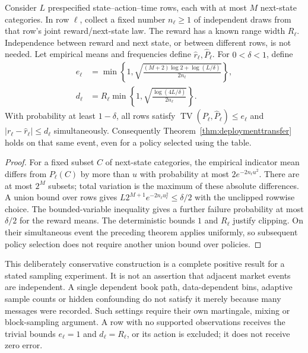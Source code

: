 \begin{proposition}
\label{prop:deploymentcoverage}
Consider $L$ prespecified state--action--time rows, each with at most $M$
next-state categories. In row $\ell$, collect a fixed number $n_\ell\ge1$
of independent draws from that row's joint reward/next-state law.
The reward has a known range width $R_\ell$. Independence between reward
and next state, or between different rows, is not needed. Let empirical
means and frequencies define $\widehat r_\ell,\widehat P_\ell$.
For $0<\delta<1$, define
\begin{align}
 e_\ell&=\min\left\{1,
 \sqrt{\frac{(M+2)\log2+\log(L/\delta)}{2n_\ell}}\right\},
 \label{eq:deployeps}\\
 d_\ell&=R_\ell\min\left\{1,
 \sqrt{\frac{\log(4L/\delta)}{2n_\ell}}\right\}.
 \label{eq:deployeta}
\end{align}
With probability at least $1-\delta$, all rows satisfy
$\operatorname{TV}(P_\ell,\widehat P_\ell)\le e_\ell$ and
$|r_\ell-\widehat r_\ell|\le d_\ell$ simultaneously.
Consequently Theorem~\ref{thm:deploymenttransfer} holds on that same event,
even for a policy selected using the table.
\end{proposition}
\begin{proof}
For a fixed subset $C$ of next-state categories, the empirical indicator
mean differs from $P_\ell(C)$ by more than $u$ with probability at most
$2e^{-2n_\ell u^2}$. There are at most $2^M$ subsets; total variation is
the maximum of these absolute differences. A union bound over rows gives
$L2^{M+1}e^{-2n_\ell u_\ell^2}\le\delta/2$ with the unclipped rowwise
choice. The bounded-variable inequality gives a further failure
probability at most $\delta/2$ for the reward means. The deterministic
bounds $1$ and $R_\ell$ justify clipping. On their simultaneous event the
preceding theorem applies uniformly, so subsequent policy selection does
not require another union bound over policies.
\end{proof}

This deliberately conservative construction is a complete positive result
for a stated sampling experiment. It is not an assertion that adjacent
market events are independent. A single dependent book path, data-dependent
bins, adaptive sample counts or hidden confounding do not satisfy it merely
because many messages were recorded. Such settings require their own
martingale, mixing or block-sampling argument. A row with no supported
observations receives the trivial bounds $e_\ell=1$ and $d_\ell=R_\ell$,
or its action is excluded; it does not receive zero error.

